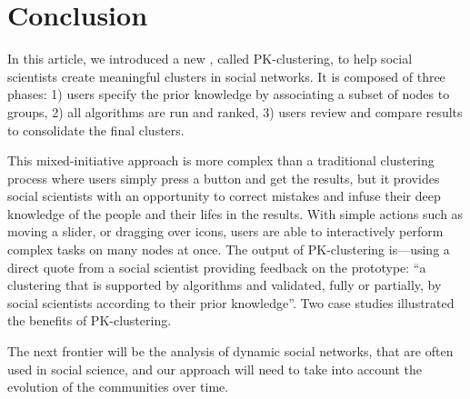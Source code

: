 \section{Conclusion}

In this article, we introduced a new , called PK-clustering, to help social scientists create meaningful clusters in social networks. It is composed of three phases: 1) users specify the prior knowledge by associating a subset of nodes to groups, 2) all algorithms are run and ranked, 3)  users review and compare results to consolidate the final clusters.

This mixed-initiative approach is more complex than a traditional clustering process where users simply press a button and get
the results, but it provides social scientists with an opportunity to correct mistakes and infuse their deep knowledge of the people and their lifes in the results. With simple actions such as moving a slider, or dragging over icons, users are able to interactively perform complex tasks on many nodes at once. The output of PK-clustering is---using a direct quote from a social scientist providing feedback on the prototype:  ``a clustering that is supported by algorithms and validated, fully or partially, by social scientists according to their prior knowledge''. Two case studies illustrated the benefits of PK-clustering.

The next frontier will be the analysis of dynamic social networks, that are often used in social science, and our approach will need to take into account the evolution of the communities over time.